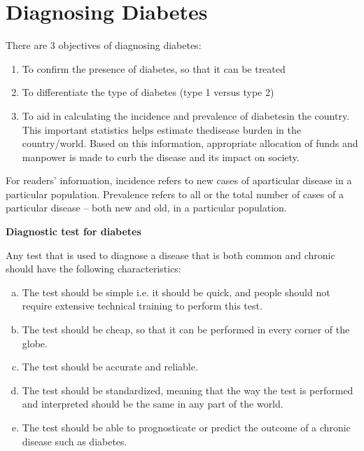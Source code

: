 \chapter{Diagnosing Diabetes}\label{chap5}

There are 3 objectives of diagnosing diabetes:

\vspace{-\topsep}
\begin{enumerate}
\itemsep=0pt
\item To confirm the presence of diabetes, so that it can be treated
\item To differentiate the type of diabetes (type 1 versus type 2)
\item To aid in calculating the incidence and prevalence of diabetes\break in the country. This important statistics helps estimate the\break disease burden in the country/world. Based on this information, appropriate allocation of funds and manpower is made to curb the disease and its impact on society.
\end{enumerate}
\vspace{-\topsep}

For readers’ information, incidence refers to new cases of a\break parti\-cular disease in a particular population. Prevalence refers to all or the total number of cases of a particular disease – both new and old, in a particular population.

\noindent
\textbf{Diagnostic test for diabetes}

Any test that is used to diagnose a disease that is both common and chronic should have the following characteristics:

\vspace{-\topsep}
\begin{enumerate}[a.]
\itemsep=0pt
\item The test should be simple i.e. it should be quick, and people should not require extensive technical training to perform this test.
 \item The test should be cheap, so that it can be performed in every corner of the globe.
 \item The test should be accurate and reliable.
 \item The test should be standardized, meaning that the way the test is performed and interpreted should be the same in any part of the world.
 \item The test should be able to prognosticate or predict the outcome of a chronic disease such as diabetes.
 \end{enumerate}
 \vspace{-\topsep}

